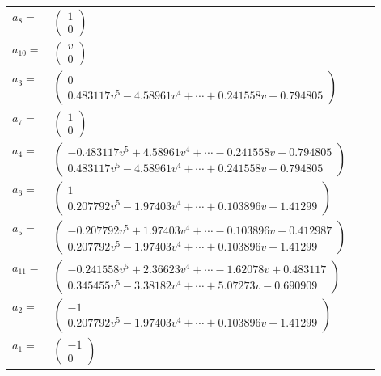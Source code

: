 \documentclass[1p]{elsarticle_modified}
\theoremstyle{definition}
\begin{document}
\begin{tabular}{m{7pt} m{180pt} m{7pt} m{180pt} }
\flushright $a_{8}=$&$\begin{pmatrix}1\\0\end{pmatrix}$ \\
\flushright $a_{10}=$&$\begin{pmatrix}v\\0\end{pmatrix}$ \\
\flushright $a_{3}=$&$\begin{pmatrix}0\\0.483117 v^{5}-4.58961 v^{4}+\cdots+0.241558 v-0.794805\end{pmatrix}$ \\
\flushright $a_{7}=$&$\begin{pmatrix}1\\0\end{pmatrix}$ \\
\flushright $a_{4}=$&$\begin{pmatrix}-0.483117 v^{5}+4.58961 v^{4}+\cdots-0.241558 v+0.794805\\0.483117 v^{5}-4.58961 v^{4}+\cdots+0.241558 v-0.794805\end{pmatrix}$ \\
\flushright $a_{6}=$&$\begin{pmatrix}1\\0.207792 v^{5}-1.97403 v^{4}+\cdots+0.103896 v+1.41299\end{pmatrix}$ \\
\flushright $a_{5}=$&$\begin{pmatrix}-0.207792 v^{5}+1.97403 v^{4}+\cdots-0.103896 v-0.412987\\0.207792 v^{5}-1.97403 v^{4}+\cdots+0.103896 v+1.41299\end{pmatrix}$ \\
\flushright $a_{11}=$&$\begin{pmatrix}-0.241558 v^{5}+2.36623 v^{4}+\cdots-1.62078 v+0.483117\\0.345455 v^{5}-3.38182 v^{4}+\cdots+5.07273 v-0.690909\end{pmatrix}$ \\
\flushright $a_{2}=$&$\begin{pmatrix}-1\\0.207792 v^{5}-1.97403 v^{4}+\cdots+0.103896 v+1.41299\end{pmatrix}$ \\
\flushright $a_{1}=$&$\begin{pmatrix}-1\\0\end{pmatrix}$ \\

\end{tabular}
\end{document}
